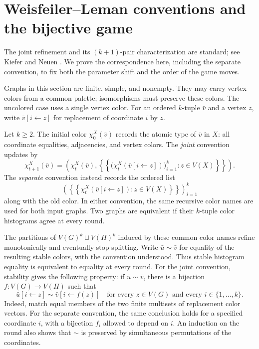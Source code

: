 \section{Weisfeiler--Leman conventions and the bijective game}
\label{game:section}

The joint refinement and its $(k+1)$-pair characterization are standard;
see Kiefer and Neuen \cite[Section~2.2 and Theorem~1]{KieferNeuen2019}.
We prove the correspondence here, including the separate convention,
to fix both the parameter shift and the order of the game moves.

Graphs in this section are finite, simple, and nonempty.  They may carry
vertex colors from a common palette; isomorphisms must preserve these
colors.  The uncolored case uses a single vertex color.  For an ordered
$k$-tuple $\bar v$ and a vertex $z$, write $\bar v[i\leftarrow z]$ for
replacement of coordinate $i$ by $z$.

\begin{definition}
\label{game:conventions}
Let $k\geq 2$.  The initial color $\chi_0^X(\bar v)$ records the atomic
type of $\bar v$ in $X$: all coordinate equalities, adjacencies, and vertex
colors.  The \emph{joint} convention updates by
\[
 \chi_{t+1}^X(\bar v)=
 \left(\chi_t^X(\bar v),
 \left\{\!\left\{
   \bigl(\chi_t^X(\bar v[i\leftarrow z])\bigr)_{i=1}^k
       :z\in V(X)
 \right\}\!\right\}\right).
\]
The \emph{separate} convention instead records the ordered list
\[
 \left(
 \left\{\!\left\{
   \chi_t^X(\bar v[i\leftarrow z]):z\in V(X)
 \right\}\!\right\}\right)_{i=1}^k
\]
along with the old color.  In either convention, the same recursive color
names are used for both input graphs.  Two graphs are equivalent if their
$k$-tuple color histograms agree at every round.
\end{definition}

The partitions of $V(G)^k\sqcup V(H)^k$ induced by these common color
names refine monotonically and eventually stop splitting.  Write
$\bar u\sim\bar v$ for equality of the resulting stable colors, with
the convention understood.  Thus stable histogram equality is equivalent
to equality at every round.  For the joint convention, stability gives
the following property: if $\bar u\sim\bar v$, there is a bijection
$f:V(G)\to V(H)$ such that
\begin{equation}
 \bar u[i\leftarrow z]\sim\bar v[i\leftarrow f(z)]
 \quad\text{for every }z\in V(G)\text{ and every }i\in\{1,\ldots,k\}.
 \label{game:joint-extension}
\end{equation}
Indeed, match equal members of the two finite multisets of replacement
color vectors.  For the separate convention, the same conclusion holds
for a specified coordinate $i$, with a bijection $f_i$ allowed to depend
on $i$.  An induction on the round also shows that $\sim$ is preserved
by simultaneous permutations of the coordinates.

